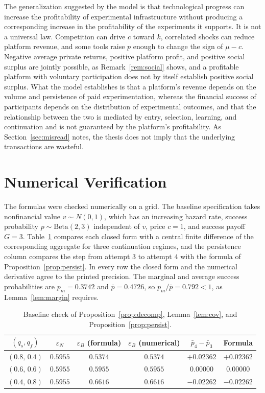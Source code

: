 \documentclass[11pt]{article}
\theoremstyle{remark}
\begin{document}
The generalization suggested by the model is that technological progress can increase the profitability of experimental infrastructure without producing a corresponding increase in the profitability of the experiments it supports. It is not a universal law. Competition can drive $c$ toward $k$, correlated shocks can reduce platform revenue, and some tools raise $p$ enough to change the sign of $\mu-c$. Negative average private returns, positive platform profit, and positive social surplus are jointly possible, as Remark~\ref{rem:social} shows, and a profitable platform with voluntary participation does not by itself establish positive social surplus. What the model establishes is that a platform's revenue depends on the volume and persistence of paid experimentation, whereas the financial success of participants depends on the distribution of experimental outcomes, and that the relationship between the two is mediated by entry, selection, learning, and continuation and is not guaranteed by the platform's profitability. As Section~\ref{sec:misread} notes, the thesis does not imply that the underlying transactions are wasteful.

\appendix

\section{Numerical Verification}\label{app:num}

The formulas were checked numerically on a grid. The baseline specification takes nonfinancial value $v\sim N(0,1)$, which has an increasing hazard rate, success probability $p\sim\mathrm{Beta}(2,3)$ independent of $v$, price $c=1$, and success payoff $G=3$. Table~\ref{tab:num} compares each closed form with a central finite difference of the corresponding aggregate for three continuation regimes, and the persistence column compares the step from attempt $3$ to attempt $4$ with the formula of Proposition~\ref{prop:persist}. In every row the closed form and the numerical derivative agree to the printed precision. The marginal and average success probabilities are $p_m=0.3742$ and $\bar p=0.4726$, so $p_m/\bar p=0.792<1$, as Lemma~\ref{lem:margin} requires.

\begin{table}[h]
\centering
\small
\begin{tabular}{|c|c|c|c|c|c|}
\hline
$(q_s,q_f)$ & $\varepsilon_N$ & $\varepsilon_B$ (formula) & $\varepsilon_B$ (numerical) & $\bar p_4-\bar p_3$ & Formula \\
\hline
$(0.8,\,0.4)$ & $0.5955$ & $0.5374$ & $0.5374$ & $+0.02362$ & $+0.02362$ \\
$(0.6,\,0.6)$ & $0.5955$ & $0.5955$ & $0.5955$ & $0.00000$ & $0.00000$ \\
$(0.4,\,0.8)$ & $0.5955$ & $0.6616$ & $0.6616$ & $-0.02262$ & $-0.02262$ \\
\hline
\end{tabular}
\caption{Baseline check of Proposition~\ref{prop:decomp}, Lemma~\ref{lem:cov}, and Proposition~\ref{prop:persist}.}\label{tab:num}
\end{table}
\end{document}

